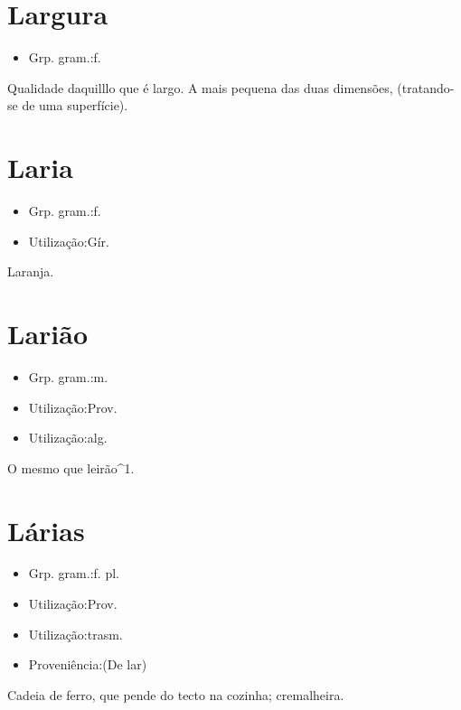 \section{Largura}
\begin{itemize}
\item {Grp. gram.:f.}
\end{itemize}
Qualidade daquilllo que é largo.
A mais pequena das duas dimensões, (tratando-se de uma superfície).
\section{Laria}
\begin{itemize}
\item {Grp. gram.:f.}
\end{itemize}
\begin{itemize}
\item {Utilização:Gír.}
\end{itemize}
Laranja.
\section{Larião}
\begin{itemize}
\item {Grp. gram.:m.}
\end{itemize}
\begin{itemize}
\item {Utilização:Prov.}
\end{itemize}
\begin{itemize}
\item {Utilização:alg.}
\end{itemize}
O mesmo que \textunderscore leirão\textunderscore ^1.
\section{Lárias}
\begin{itemize}
\item {Grp. gram.:f. pl.}
\end{itemize}
\begin{itemize}
\item {Utilização:Prov.}
\end{itemize}
\begin{itemize}
\item {Utilização:trasm.}
\end{itemize}
\begin{itemize}
\item {Proveniência:(De \textunderscore lar\textunderscore )}
\end{itemize}
Cadeia de ferro, que pende do tecto na cozinha; cremalheira.
